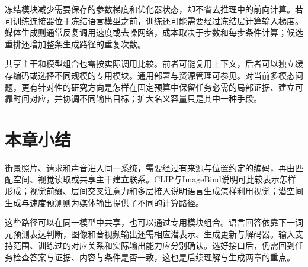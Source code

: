 冻结模块减少需要保存的参数梯度和优化器状态，却不省去推理中的前向计算。若可训练连接器位于冻结语言模型之前，训练还可能需要经过冻结层计算输入梯度。媒体生成则通常反复调用速度或去噪网络，成本取决于步数和每步条件计算；候选重排还增加整条生成路径的重复次数。

共享主干和模型组合也需按实际调用比较。前者可能复用上下文，后者可以独立缓存编码或选择不同规模的专用模块。通用部署与资源管理可参见。对当前多模态问题，更有针对性的研究方向是怎样在固定预算中保留任务必需的局部证据、建立可靠时间对应，并协调不同输出目标；扩大名义容量只是其中一种手段。

\section{本章小结}
\label{sec:vision-models-summary}

街景照片、请求和声音进入同一系统，需要经过有来源与位置约定的编码，再由匹配空间、视觉读取或共享主干建立联系。CLIP与ImageBind说明可比较表示怎样形成；视觉前缀、层间交叉注意力和多层接入说明语言生成怎样利用视觉；潜空间生成与速度预测则为媒体输出提供了不同的计算路径。

这些路径可以在同一模型中共享，也可以通过专用模块组合。语言回答依靠下一词元预测表达判断，图像和音视频输出还需相应潜表示、生成更新与解码器。输入支持范围、训练过的对应关系和实际输出能力应分别确认。选好接口后，仍需回到任务检查答案与证据、内容与条件是否一致，这也是后续理解与生成两章的重点。
